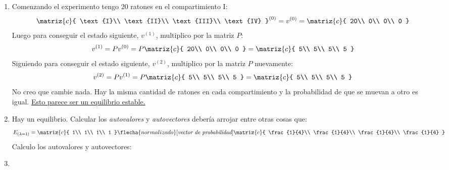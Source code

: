 \begin{enumerate}[label=(\alph*)]
  \item Comenzando el experimento tengo 20 ratones en el compartimiento I:
        $$
          \matriz{c}{
            \text{I}\\
            \text{II}\\
            \text{III}\\
            \text{IV}
          }^{(0)} =
          v^{(0)} =
          \matriz{c}{
            20\\
            0\\
            0\\
            0
          }
        $$
        Luego para conseguir el estado siguiente, $v^{(1)}$, multiplico por la matriz $P$:
        $$
          v^{(1)}=
          P v^{(0)} =
          P \matriz{c}{
            20\\
            0\\
            0\\
            0
          }
          =
          \matriz{c}{
            5\\
            5\\
            5\\
            5
          }
        $$
        Siguiendo para conseguir el estado siguiente, $v^{(2)}$, multiplico por la matriz $P$ nuevamente:
        $$
          v^{(2)}=
          P v^{(1)} =
          P \matriz{c}{
            5\\
            5\\
            5\\
            5
          }
          =
          \matriz{c}{
            5\\
            5\\
            5\\
            5
          }
        $$
        No creo que cambie nada. Hay la misma cantidad de ratones en cada compartimiento y la probabilidad de que se muevan a otro es igual.
        \underline{Esto parece ser un equilibrio estable.}

  \item Hay un equilibrio. Calcular los \textit{autovalores} y \textit{autovectores} debería arrojar entre otras cosas que:
        $$
          E_{(\lambda = 1)} =
          \matriz{c}{
            1\\
            1\\
            1\\
            1
          }
          \flecha{normalizado}[\textit{vector de probabilidad}]
          \matriz{c}{
            \frac{1}{4}\\
            \frac{1}{4}\\
            \frac{1}{4}\\
            \frac{1}{4}
          }
        $$
        Calculo los autovalores y autovectores:

  \item \hacer
\end{enumerate}

\begin{aportes}
  \item {}
\end{aportes}
